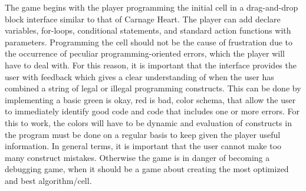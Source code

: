 The game begins with the player programming the initial cell in a drag-and-drop block interface similar to that of Carnage Heart.
The player can add declare variables, for-loops, conditional statements, and standard action functions with parameters.
Programming the cell should not be the cause of frustration due to the occurrence of peculiar programming-oriented errors, which the player will have to deal with.
For this reason, it is important that the interface provides the user with feedback which gives a clear understanding of when the user has combined a string of legal or illegal programming constructs.
This can be done by implementing a basic green is okay, red is bad, color schema, that allow the user to immediately identify good code and code that includes one or more errors.
For this to work, the colors will have to be dynamic and evaluation of constructs in the program must be done on a regular basis to keep given the player useful information. 
In general terms, it is important that the user cannot make too many construct mistakes.
Otherwise the game is in danger of becoming a debugging game, when it should be a game about creating the most optimized and best algorithm/cell.

